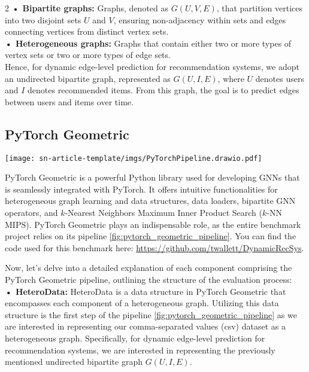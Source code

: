 \documentclass[bst/sn-nature]{sn-jnl}
\begin{document}
\begin{multicols}{2}
\textbf{• Bipartite graphs:} Graphs, denoted as $G(U, V, E)$, that partition vertices into two disjoint sets $U$ and $V$, ensuring non-adjacency within sets and edges connecting vertices from distinct vertex sets. \\

\textbf{• Heterogeneous graphs:} Graphs that contain either two or more types of vertex sets or two or more types of edge sets. \\ 

Hence, for dynamic edge-level prediction for recommendation systems, we adopt an undirected bipartite graph, represented as $G(U, I, E)$, where $U$ denotes users and $I$ denotes recommended items. From this graph, the goal is to predict edges between users and items over time.

\subsection{PyTorch Geometric}

\begin{figure*}
    \centering
    \texttt{[image: sn-article-template/imgs/PyTorchPipeline.drawio.pdf]}
    \caption{PyTorch Geometric Dynamic Recommendation System Pipeline.}
    \label{fig:pytorch_geometric_pipeline}
\end{figure*}

\quad PyTorch Geometric is a powerful Python library used for developing GNNs that is seamlessly integrated with PyTorch. It offers intuitive functionalities for heterogeneous graph learning and data structures, data loaders, bipartite GNN operators, and $k$-Nearest Neighbors Maximum Inner Product Search ($k$-NN MIPS). PyTorch Geometric plays an indispensable role, as the entire benchmark project relies on its pipeline \ref{fig:pytorch_geometric_pipeline}. You can find the code used for this benchmark here: \href{https://github.com/twallett/DynamicRecSys}{https://github.com/twallett/DynamicRecSys}. 

Now, let's delve into a detailed explanation of each component comprising the PyTorch Geometric pipeline, outlining the structure of the evaluation process: \\

\textbf{• HeteroData:} HeteroData is a data structure in PyTorch Geometric that encompasses each component of a heterogeneous graph. Utilizing this data structure is the first step of the pipeline \ref{fig:pytorch_geometric_pipeline} as we are interested in representing our comma-separated values (csv) dataset as a heterogeneous graph. Specifically, for dynamic edge-level prediction for recommendation systems, we are interested in representing the previously mentioned undirected bipartite graph $G(U,I,E)$. 


\end{multicols}
\end{document}
